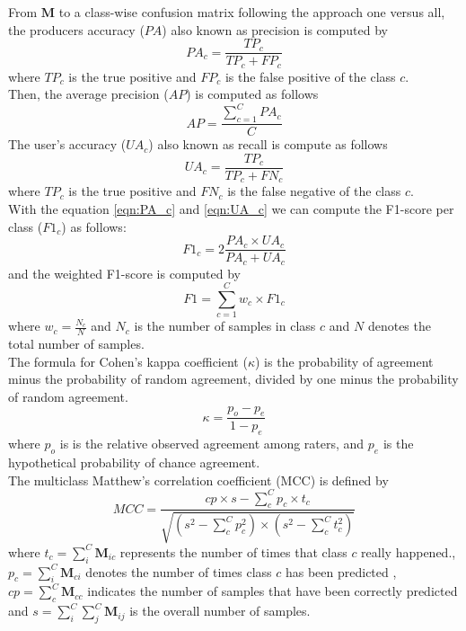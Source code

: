 \documentclass[journal,article,submit,pdftex,moreauthors]{Definitions/mdpi}
\begin{document}
From $\mathbf{M}$ to a class-wise confusion matrix following the approach one versus all, the producers accuracy ($PA$) also known as precision is computed by \\
\begin{equation}
	\label{eqn:PA_c}
	PA_c = \frac{TP_c}{TP_c + FP_c}
\end{equation}
where $TP_c$ is the true positive and $FP_c$ is the false positive of the class $c$. \\
Then, the average precision ($AP$) is computed as follows
\begin{equation}
	\label{eqn:AA}
	AP = \frac{\sum_{c=1}^{C} PA_c}{C}
\end{equation}
The user's accuracy ($UA_c$) also known as recall is compute as follows
\begin{equation}
	\label{eqn:UA_c}
	UA_c = \frac{TP_c}{TP_c + FN_c}
\end{equation}
where $TP_c$ is the true positive and $FN_c$ is the false negative of the class $c$.\\
With the equation \ref{eqn:PA_c} and \ref{eqn:UA_c} we can compute the F1-score per class ($F1_c$) as follows:
\begin{equation}
	\label{eqn:F1_c}
	F1_c = 2 \frac{PA_c \times UA_c}{PA_c + UA_c}
\end{equation}
and the weighted F1-score is computed by
\begin{equation}
    F1 = \sum^{C}_{c=1} w_{c} \times F1_{c}
\end{equation}
where $w_{c} = \frac{N_{c}}{N} $ and $N_c$ is the number of samples in class $c$ and $N$ denotes the total number of samples.\\

The formula for Cohen’s kappa coefficient ($\kappa$) is the probability of agreement minus the probability of random agreement, divided by one minus the probability of random agreement.\\
\begin{equation}
	\label{eqn:k}
	\kappa= \frac{p_o - p_e}{1 - p_e}
\end{equation}
where $p_o$ is is the relative observed agreement among raters, and $p_e$ is the hypothetical probability of chance agreement.\\
The multiclass Matthew's correlation coefficient (MCC) is defined by
\begin{equation}
    MCC = \frac{cp \times s - \sum^{C}_{c} p_{c} \times t_{c} }{\sqrt{( s^{2} - \sum^{C}_{c} p^{2}_{c}) \times (s^{2} - \sum^{C}_{c} t^{2}_{c})}}
\end{equation}
where $t_{c} = \sum^{C}_{i} \mathbf{M}_{ic}$ represents the number of times that class $c$ really happened., $p_{c} = \sum^{C}_{i} \mathbf{M}_{ci}$ denotes the number of times class $c$ has been predicted , $cp = \sum^{C}_{c} \mathbf{M}_{cc}$ indicates the number of samples that have been correctly predicted and $s= \sum^{C}_{i} \sum^{C}_{j} \mathbf{M}_{ij}$ is the overall number of samples.
\end{document}
